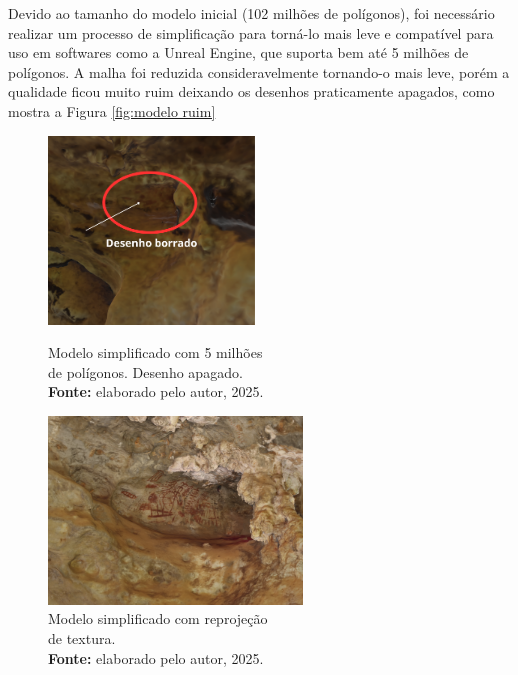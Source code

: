 Devido ao tamanho do modelo inicial (102 milhões de polígonos), foi necessário realizar um processo de simplificação para torná-lo mais leve e compatível para uso em softwares como a Unreal Engine, que suporta bem até 5 milhões de polígonos. A malha foi reduzida consideravelmente tornando-o mais leve, porém a qualidade ficou muito ruim deixando os desenhos praticamente apagados, como mostra a Figura \ref{fig:modelo ruim}

\begin{figure}[H]
    \centering
    \begin{minipage}{0.45\textwidth} %
        \centering
        \includegraphics[height=5cm, keepaspectratio]{img/reality e fotogrametria processo/modelo ruim.png}
        \caption{Modelo simplificado com 5 milhões \\ de polígonos. Desenho apagado. \\
            \textbf{Fonte:} elaborado pelo autor, 2025.}
        \label{fig:modelo ruim}
    \end{minipage}
    \hspace{1cm} %
    \begin{minipage}{0.45\textwidth} %
        \centering
        \includegraphics[height=5cm, keepaspectratio]{img/reality e fotogrametria processo/desenho bom retroprojeção.png}
        \caption{Modelo simplificado com reprojeção \\ de textura. \\
            \textbf{Fonte:} elaborado pelo autor, 2025.}
        \label{fig:desenho bom}
    \end{minipage}
\end{figure}


